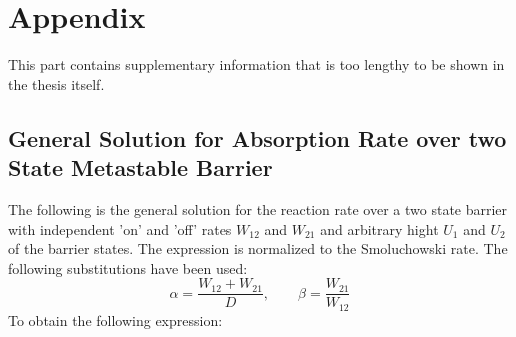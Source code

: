 \section{Appendix}
This part contains supplementary information that is too lengthy to be shown in the thesis itself.
\subsection{General Solution for Absorption Rate over two State Metastable Barrier}
The following is the general solution for the reaction rate over a two state barrier with independent 'on' and 'off' rates $W_{12}$ and $W_{21}$ and arbitrary hight $U_1$ and $U_2$ of the barrier states. The expression is normalized to the Smoluchowski rate. The following substitutions have been used:
\begin{equation}
    \alpha = \frac{W_{12} + W_{21}}{D}, \qquad \beta = \frac{W_{21}}{W_{12}}
\end{equation}
To obtain the following expression:
